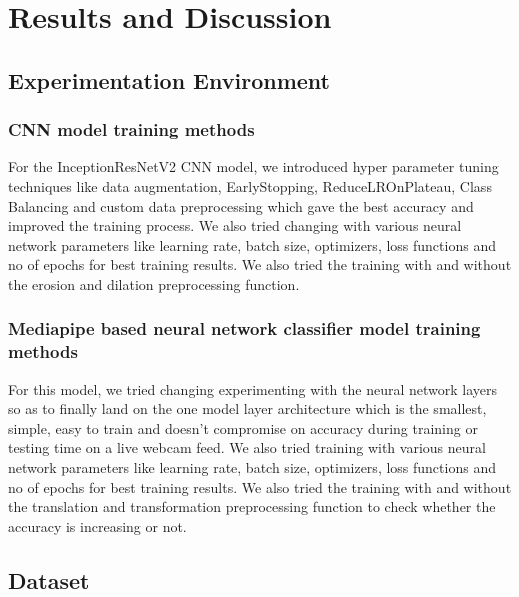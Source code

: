 \documentclass[12pt,a4paper]{report}
\begin{document}
\section{Results and Discussion}

\subsection{Experimentation Environment}

\subsubsection{CNN model training methods}
For the InceptionResNetV2 CNN model, we introduced hyper parameter tuning techniques like data augmentation, EarlyStopping, ReduceLROnPlateau, Class Balancing and custom data preprocessing which gave the best accuracy and improved the training process. We also tried changing with various neural network parameters like learning rate, batch size, optimizers, loss functions and no of epochs for best training results. We also tried the training with and without the erosion and dilation preprocessing function.


\subsubsection{Mediapipe based neural network classifier model training methods}
For this model, we tried changing experimenting with the neural network layers so as to finally land on the one model layer architecture which is the smallest, simple, easy to train and doesn't compromise on accuracy during training or testing time on a live webcam feed. We also tried training with various neural network parameters like learning rate, batch size, optimizers, loss functions and no of epochs for best training results. We also tried the training with and without the translation and transformation preprocessing function to check whether the accuracy is increasing or not.

\subsection{Dataset}
\end{document}

